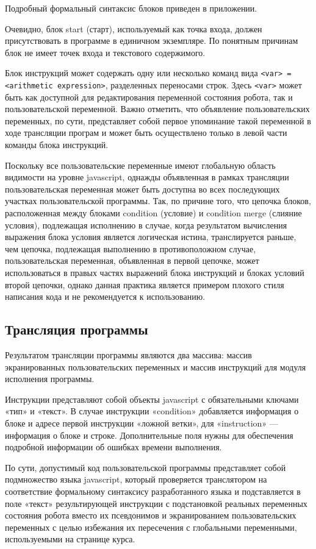Подробный формальный синтаксис блоков приведен в приложении.

Очевидно, блок start (старт), используемый как точка входа, должен присутствовать в программе в единичном экземпляре. По понятным причинам блок не имеет точек входа и текстового содержимого.

Блок инструкций может содержать одну или несколько команд вида \lstinline|<var> = <arithmetic expression>|, разделенных переносами строк. Здесь \lstinline|<var>| может быть как доступной для редактирования переменной состояния робота, так и пользовательской переменной. Важно отметить, что объявление пользовательских переменных, по сути, представляет собой первое упоминание такой переменной в ходе трансляции програм и может быть осуществлено только в левой части команды блока инструкций.

Поскольку все пользовательские переменные имеют глобальную область видимости на уровне javascript, однажды объявленная в рамках трансляции пользовательская переменная может быть доступна во всех последующих участках пользовательской программы. Так, по причине того, что цепочка блоков, расположенная между блоками condition (условие) и condition merge (слияние условия), подлежащая исполнению в случае, когда результатом вычисления выражения блока условия является логическая истина, транслируется раньше, чем цепочка, подлежащая выполнению в противоположном случае, пользовательская переменная, объявленная в первой цепочке, может использоваться в правых частях выражений блока инструкций и блоках условий второй цепочки, однако данная практика является примером плохого стиля написания кода и не рекомендуется к использованию.  

\subsection{Трансляция программы}

Результатом трансляции программы являются два массива: массив экранированных пользовательских переменных и массив инструкций для модуля исполнения программы.

Инструкции представляют собой объекты javascript с обязательными ключами «тип» и «текст». В случае инструкции «condition» добавляется информация о блоке и адресе первой инструкции «ложной ветки», для «instruction» — информация о блоке и строке. Дополнительные поля нужны для обеспечения подробной информации об ошибках времени выполнения.

По сути, допустимый код пользовательской программы представляет собой подмножество языка javascript, который проверяется транслятором на соответствие формальному синтаксису разработанного языка и подставляется в поле «текст» результирующей инструкции с подстановкой реальных переменных состояния робота вместо их псевдонимов и экранированием пользовательских переменных с целью избежания их пересечения с глобальными переменными, используемыми на странице курса.

